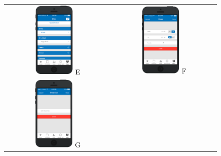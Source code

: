 \documentclass[a4paper, 11pt, titlepage]{article}
\begin{document}
\begin{figure}[H]
	\centering
	
	\begin{tabular}{cc}
		\includegraphics[width=0.38\textwidth]{figures/mockups/diary-1.png} E &
		\includegraphics[width=0.38\textwidth]{figures/mockups/diary-2.png} F \\
		\includegraphics[width=0.38\textwidth]{figures/mockups/diary-3.png} G &

\end{tabular}
\end{figure}
\end{document}
